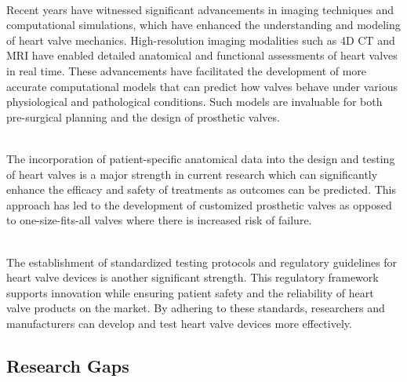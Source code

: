 \\
Recent years have witnessed significant advancements in imaging techniques and computational simulations, which have enhanced the understanding and modeling of heart valve mechanics. High-resolution imaging modalities such as 4D \gls{CT} and \gls{MRI} have enabled detailed anatomical and functional assessments of heart valves in real time. These advancements have facilitated the development of more accurate computational models that can predict how valves behave under various physiological and pathological conditions. Such models are invaluable for both pre-surgical planning and the design of prosthetic valves.

\\
The incorporation of patient-specific anatomical data into the design and testing of heart valves is a major strength in current research which can significantly enhance the efficacy and safety of treatments as outcomes can be predicted. This approach has led to the development of customized prosthetic valves as opposed to one-size-fits-all valves where there is increased risk of failure.~


\\
The establishment of standardized testing protocols and regulatory guidelines for heart valve devices is another significant strength. This regulatory framework supports innovation while ensuring patient safety and the reliability of heart valve products on the market. By adhering to these standards, researchers and manufacturers can develop and test heart valve devices more effectively.


\subsection{Research Gaps}

